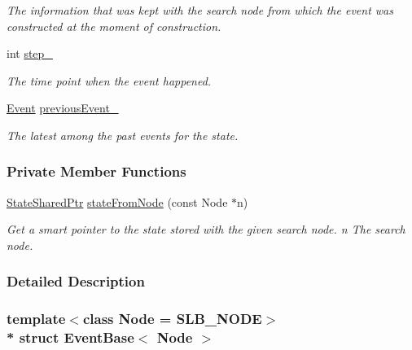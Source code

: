 \begin{DoxyCompactItemize}
\begin{DoxyCompactList}\small\item\em The information that was kept with the search node from which the event was constructed at the moment of construction. \end{DoxyCompactList}\item 
int \hyperlink{structEventBase_a0f34510d095f1a5bb5b3b31d1b5e68e8}{step\+\_\+}\hypertarget{structEventBase_a0f34510d095f1a5bb5b3b31d1b5e68e8}{}\label{structEventBase_a0f34510d095f1a5bb5b3b31d1b5e68e8}

\begin{DoxyCompactList}\small\item\em The time point when the event happened. \end{DoxyCompactList}\item 
\hyperlink{structEventBase_a0ff1657dcfd85f6d094902d57e8f2af5}{Event} \hyperlink{structEventBase_ad6862f3bfa1e7c594c0afe39caf643d8}{previous\+Event\+\_\+}\hypertarget{structEventBase_ad6862f3bfa1e7c594c0afe39caf643d8}{}\label{structEventBase_ad6862f3bfa1e7c594c0afe39caf643d8}

\begin{DoxyCompactList}\small\item\em The latest among the past events for the state. \end{DoxyCompactList}\end{DoxyCompactItemize}
\subsubsection*{Private Member Functions}
\begin{DoxyCompactItemize}
\item 
\hyperlink{structEventBase_a2c0edb5cda08ce1965f3440a97b3fc87}{State\+Shared\+Ptr} \hyperlink{structEventBase_af84c9d22ce8599454c9ac520f9e1037e}{state\+From\+Node} (const Node $\ast$n)
\begin{DoxyCompactList}\small\item\em Get a smart pointer to the state stored with the given search node. n The search node. \end{DoxyCompactList}\end{DoxyCompactItemize}


\subsubsection{Detailed Description}
\subsubsection*{template$<$class Node = S\+L\+B\+\_\+\+N\+O\+DE$>$\\*
struct Event\+Base$<$ Node $>$}

